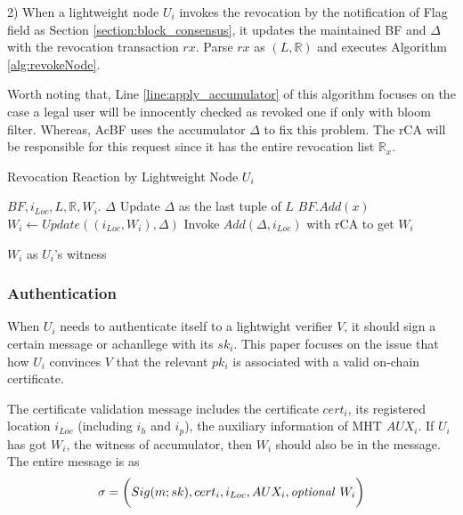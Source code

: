 \documentclass[conference]{IEEEtran}
\begin{document}
2) When a lightweight node $U_i$ invokes the revocation by the notification of Flag field as Section \ref{section:block_consensus}, it updates the maintained BF and $\Delta$ with the revocation transaction $rx$. Parse $rx$ as $(L, \mathbb{R})$ and executes Algorithm \ref{alg:revokeNode}.

Worth noting that, Line \ref{line:apply_accumulator} of this algorithm focuses on the case a legal user will be innocently checked as revoked one if only with bloom filter. Whereas, AcBF uses the accumulator $\Delta$ to fix this problem. The rCA will be responsible for this request since it has the entire revocation list $\mathbb{R}_x$.

\begin{algorithm}[t]
	\renewcommand{\algorithmicensure}{\textbf{Output:}}
	\caption{Revocation Reaction by Lightweight Node $U_i$}\label{alg:revokeNode}
	\begin{algorithmic}[1]
		\Require $BF, i_{Loc}, L, \mathbb{R}, W_i$. 
		\Ensure $\Delta$
		\State Update $\Delta$ as the last tuple of $L$
		\EndIf
		\State $BF.Add(x)$ 
		\EndFor
		\State $W_i\gets Update((i_{Loc}, W_i), \Delta)$ 
		\EndFor
		\State Invoke $Add(\Delta, i_{Loc})$ with rCA to get $W_i$ \label{line:apply_accumulator}
		
		\Return $W_i$ as $U_i$'s witness
		\EndIf
	\end{algorithmic}
\end{algorithm}

\subsubsection{Authentication}\label{section:authentication}
When $U_i$ needs to authenticate itself to a lightwight verifier $V$, it should sign a certain message or achanllege with its $sk_i$. This paper focuses on the issue that how $U_i$ convinces $V$ that the relevant $pk_i$ is associated with a valid on-chain certificate.

The certificate validation message includes the certificate $cert_i$, its registered location $i_{Loc}$ (including $i_h$ and $i_p$), the auxiliary information of MHT $AUX_i$. If $U_i$ has got $W_i$, the witness of accumulator, then $W_i$ should also be in the message. The entire message is as 
$$\sigma = \biggl(Sig(m; sk), cert_i, i_{Loc}, AUX_i, \mbox{\textit{optional }} W_i\biggr)$$
\end{document}
